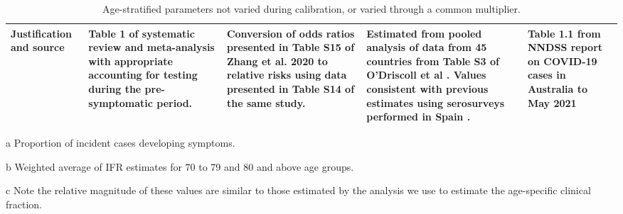 \begin{table}
\begin{threeparttable}
\begin{tabular}{| p{2cm} | p{2.5cm} | p{3cm} | p{3cm} | p{2.5cm}|}
        \hline
        Justification and source & 
        Table 1 of systematic review and meta-analysis with appropriate accounting for testing during the pre-symptomatic period. & 
        Conversion of odds ratios presented in Table S15 of Zhang et al. 2020 to relative risks using data presented in Table S14 of the same study.\tnote{c} &
        Estimated from pooled analysis of data from 45 countries from Table S3 of O'Driscoll et al \cite{odriscoll-2021}. 
        Values consistent with previous estimates using serosurveys performed in Spain \cite{RN21}. &
        Table 1.1 from NNDSS report on COVID-19 cases in Australia to May 2021 \\ 
        \hline
	\end{tabular}
	\caption{Age-stratified parameters not varied during calibration, or varied through a common multiplier.}
	\label{tab:age_params}
    \begin{tablenotes}
        \item[a] Proportion of incident cases developing symptoms.
        \item[b] Weighted average of IFR estimates for 70 to 79 and 80 and above age groups.
        \item[c] Note the relative magnitude of these values are similar to those estimated by the analysis we use to estimate the age-specific clinical fraction.
    \end{tablenotes}
    \end{threeparttable}
\end{table}

\clearpage